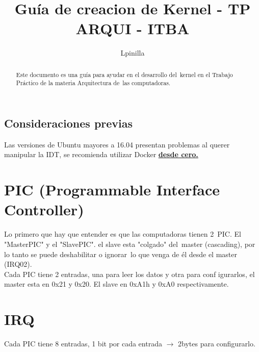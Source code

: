 \documentclass[]{article}
\title{Guía de creacion de Kernel - TP ARQUI - ITBA}
\author{Lpinilla}
\begin{document}
\maketitle

\begin{abstract}
	Este documento es una guía para ayudar en el desarrollo del\
	kernel en el Trabajo Práctico de la materia Arquitectura de\
	las computadoras. 
\end{abstract}

\subsection*{Consideraciones previas}
Las versiones de Ubuntu mayores a 16.04 presentan problemas al querer manipular la IDT, se recomienda utilizar Docker \textbf{\underline{desde cero.}}

\section*{PIC (Programmable Interface Controller)}
Lo primero que hay que entender es que las computadoras tienen 2\
PIC. El "MasterPIC" y el "SlavePIC". el slave esta "colgado" del\
master (cascading), por lo tanto se puede deshabilitar o ignorar\
lo que venga de él desde el master (IRQ02).\\
Cada PIC tiene 2 entradas, una para leer los datos y otra para conf
igurarlos, el master esta en 0x21 y 0x20. El slave en 0xA1h y 0xA0
respectivamente.

\section*{IRQ}
Cada PIC tiene 8 entradas, 1 bit por cada entrada $\longrightarrow$ 2bytes para configurarlo.
\end{document}
